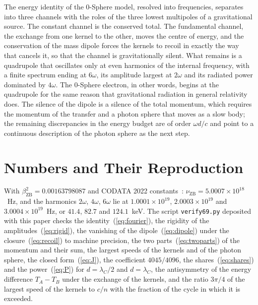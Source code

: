 \documentclass[%
 reprint, amsmath,amssymb, aps, prb, ]{revtex4-2}
\numberwithin{equation}{section}
\begin{document}
The energy identity of the 0-Sphere model, resolved into frequencies, separates into three channels with the roles of the three lowest multipoles of a gravitational source. The constant channel is the conserved total. The fundamental channel, the exchange from one kernel to the other, moves the centre of energy, and the conservation of the mass dipole forces the kernels to recoil in exactly the way that cancels it, so that the channel is gravitationally silent. What remains is a quadrupole that oscillates only at even harmonics of the internal frequency, with a finite spectrum ending at $6\omega$, its amplitude largest at $2\omega$ and its radiated power dominated by $4\omega$. The 0-Sphere electron, in other words, begins at the quadrupole for the same reason that gravitational radiation in general relativity does. The silence of the dipole is a silence of the total momentum, which requires the momentum of the transfer and a photon sphere that moves as a slow body; the remaining discrepancies in the energy budget are of order $\omega d/c$ and point to a continuous description of the photon sphere as the next step.

\appendix

\section{Numbers and Their Reproduction}
\label{app:numbers}

With $\beta_{\text{ZB}}^2 = 0.00163798087$ and CODATA 2022 constants~\cite{CODATA2022}: $\nu_{\text{ZB}} = 5.0007\times10^{18}$~Hz, and the harmonics $2\omega$, $4\omega$, $6\omega$ lie at $1.0001\times10^{19}$, $2.0003\times10^{19}$ and $3.0004\times10^{19}$~Hz, or $41.4$, $82.7$ and $124.1$~keV. The script \texttt{verify69.py} deposited with this paper checks the identity~(\ref{eq:fourier}), the rigidity of the amplitudes~(\ref{eq:rigid}), the vanishing of the dipole~(\ref{eq:dipole}) under the closure~(\ref{eq:recoil}) to machine precision, the two parts~(\ref{eq:twoparts}) of the momentum and their sum, the largest speeds of the kernels and of the photon sphere, the closed form~(\ref{eq:J}), the coefficient $4045/4096$, the shares~(\ref{eq:shares}) and the power~(\ref{eq:P}) for $d = \lambda_C/2$ and $d = \lambda_C$, the antisymmetry of the energy difference $T_A - T_B$ under the exchange of the kernels, and the ratio $3\pi/4$ of the largest speed of the kernels to $c/n$ with the fraction of the cycle in which it is exceeded.
\end{document}
